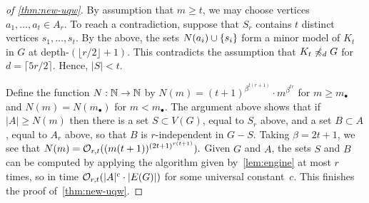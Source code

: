 \begin{proof}[of \cref{thm:new-uqw}]
By assumption that $m\ge t$, we may choose vertices $a_1,\ldots,a_t\in A_r$.
To reach a contradiction, suppose that $S_r$ contains $t$ distinct vertices $s_1,\ldots,s_t$. 
By the above, the sets $N(a_i)\cup\{s_i\}$ 
form a minor model of $K_t$ in $G$ at depth-$(\lfloor r/2\rfloor+1)$.
This contradicts the assumption that $K_t\not\preccurlyeq_d G$ for $d=\lceil 5r/2 \rceil$.
Hence, $|S|<t$.


Define the function  $N:\mathbb{N}\to\mathbb{N}$
by $N(m)=(t+1)^{\beta^{t(r+1)}}\cdot m^{\beta^{tr}}$
for $m\ge m_\bullet$  and $N(m)=N(m_\bullet)$ for $m<m_\bullet$.
The argument above shows that if $|A|\ge N(m)$ then 
there is a set $S\subset V(G)$, equal to $S_r$ above,
and a set $B\subset A$, equal to $A_r$ above,
so that $B$ is $r$-independent in $G-S$. Taking $\beta=2t+1$,
we see that $N(m)=\mathcal{O}_{r,t}{((m(t+1))^{{(2t+1)}^{r(t+1)}})}.$
Given $G$ and $A$, the sets $S$ and $B$ can be computed by applying the algorithm given by~\cref{lem:engine} at most $r$ times, so in time $\mathcal{O}_{r,t}(|A|^c\cdot |E(G)|)$ for some universal constant~$c$.
This finishes the proof of~\cref{thm:new-uqw}.
\end{proof}


